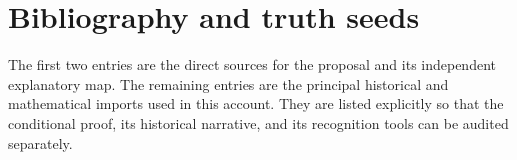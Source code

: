 \documentclass[11pt,reqno]{amsart}
\numberwithin{equation}{section}
\theoremstyle{definition}
\begin{document}
\section{Bibliography and truth seeds}\label{sec:bibliography}

The first two entries are the direct sources for the proposal and its independent explanatory map. The remaining entries are the principal historical and mathematical imports used in this account. They are listed explicitly so that the conditional proof, its historical narrative, and its recognition tools can be audited separately.

\begingroup
\makeatletter
\let\savedsection\section
\renewcommand{\section}{\@ifstar{\@gobble}{\savedsection}}
\makeatother
\end{document}
